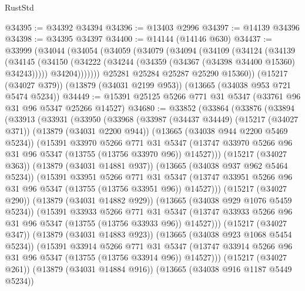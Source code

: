 \begin{lexlean}{RustStd}
\begin{coremodule}
@34395 := @34392 @34394
@34396 := @13403 @2996
@34397 := @14139 @34396
@34398 := @34395 @34397
@34400 := @14144 (@14146 @630)
@34437 := @33999
    (@34044
      (@34054
        (@34059
          (@34079
            (@34094
              (@34109
                (@34124
                  (@34139
                    (@34145
                      (@34150 (@34222 (@34244 (@34359 (@34367 (@34398 @34400 @15360) @34243)))))
                      @34204)))))))
        @25281
        @25284
        @25287
        @25290
        @15360))
    (@15217 (@34027 @379))
    (@13879 (@34031 @2199 @953))
    (@13665 (@34038 @953 @721 @5474 @5234))
@34449 := @15391 @25125 @5266 @771 @31 @5347 (@33761 @96 @31 @96 @5347 @25266 @14527)
@34680 := @33852
    (@33864
      (@33876
        (@33894
          (@33913
            (@33931
              (@33950
                (@33968
                  (@33987
                    (@34437 @34449)
                    (@15217 (@34027 @371))
                    (@13879 (@34031 @2200 @944))
                    (@13665 (@34038 @944 @2200 @5469 @5234))
                    (@15391
                      @33970
                      @5266
                      @771
                      @31
                      @5347
                      (@13747 @33970 @5266 @96 @31 @96 @5347 (@13755 (@13756 @33970 @96)) @14527)))
                  (@15217 (@34027 @363))
                  (@13879 (@34031 @14881 @937))
                  (@13665 (@34038 @937 @962 @5464 @5234))
                  (@15391
                    @33951
                    @5266
                    @771
                    @31
                    @5347
                    (@13747 @33951 @5266 @96 @31 @96 @5347 (@13755 (@13756 @33951 @96)) @14527)))
                (@15217 (@34027 @290))
                (@13879 (@34031 @14882 @929))
                (@13665 (@34038 @929 @1076 @5459 @5234))
                (@15391
                  @33933
                  @5266
                  @771
                  @31
                  @5347
                  (@13747 @33933 @5266 @96 @31 @96 @5347 (@13755 (@13756 @33933 @96)) @14527)))
              (@15217 (@34027 @347))
              (@13879 (@34031 @14883 @923))
              (@13665 (@34038 @923 @1068 @5454 @5234))
              (@15391
                @33914
                @5266
                @771
                @31
                @5347
                (@13747 @33914 @5266 @96 @31 @96 @5347 (@13755 (@13756 @33914 @96)) @14527)))
            (@15217 (@34027 @261))
            (@13879 (@34031 @14884 @916))
            (@13665 (@34038 @916 @1187 @5449 @5234))

\end{coremodule}
\end{lexlean}
